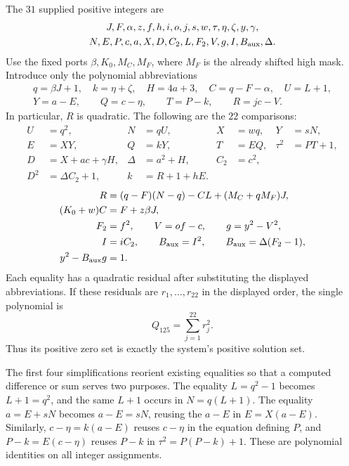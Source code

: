 The $31$ supplied positive integers are
\[
\begin{gathered}
J,F,\alpha,z,f,h,i,o,j,s,w,\tau,\eta,\zeta,y,\gamma,\\
N,E,P,c,a,X,D,C_2,L,F_2,V,g,I,B_{\rm aux},\Delta.
\end{gathered}
\]
Use the fixed ports $\beta,K_0,M_C,M_F$, where $M_F$ is the already shifted
high mask.  Introduce only the polynomial abbreviations
\[
\begin{gathered}
q=\beta J+1,\quad k=\eta+\zeta,\quad H=4a+3,
\quad C=q-F-\alpha,\quad U=L+1,\\
Y=a-E,\qquad Q=c-\eta,\qquad T=P-k,\qquad R=jc-V.
\end{gathered}
\]
In particular, $R$ is quadratic.  The following are the $22$ comparisons:
\begin{equation}
\begin{aligned}
 U&=q^2,&N&=qU,&X&=wq,&Y&=sN,\\
 E&=XY,&Q&=kY,&T&=EQ,&\tau^2&=PT+1,\\
 D&=X+ac+\gamma H,&\Delta&=a^2+H,&C_2&=c^2,\\
 D^2&=\Delta C_2+1,&k&=R+1+hE.
\end{aligned}
\label{eq:quadratic-first}
\end{equation}
\begin{equation}
\begin{aligned}
 R&=(q-F)(N-q)-CL+(M_C+qM_F)J,\\
 (K_0+w)C&=F+z\beta J,\\
 F_2&=f^2,\qquad V=of-c,\qquad g=y^2-V^2,\\
 I&=iC_2,\qquad B_{\rm aux}=I^2,
       \qquad B_{\rm aux}=\Delta(F_2-1),\\
 y^2-B_{\rm aux}g&=1.
\end{aligned}
\label{eq:quadratic-second}
\end{equation}
Each equality has a quadratic residual after substituting the displayed
abbreviations.  If these residuals are $r_1,\ldots,r_{22}$ in the displayed
order, the single polynomial is
\begin{equation}
 \boxed{\qquad Q_{125}=\sum_{j=1}^{22}r_j^2.\qquad}
 \label{eq:q125}
\end{equation}
Thus its positive zero set is exactly the system's positive solution set.

The first four simplifications reorient existing equalities so that a
computed difference or sum serves two purposes.  The equality
$L=q^2-1$ becomes $L+1=q^2$, and the same $L+1$ occurs in $N=q(L+1)$.
The equality $a=E+sN$ becomes $a-E=sN$, reusing the $a-E$ in $E=X(a-E)$.
Similarly, $c-\eta=k(a-E)$ reuses $c-\eta$ in the equation defining $P$,
and $P-k=E(c-\eta)$ reuses $P-k$ in $\tau^2=P(P-k)+1$.
These are polynomial identities on all integer assignments.

